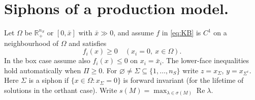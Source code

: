 \section{Siphons of a production model.}\label{s:KB}
\label{p:KBsiph}
\label{p:KBresponsezeros}\label{p:KBorder}

Let $\Omega$ be $\mathbb R_+^{n_S}$ or $[0,\bar x]$ with $\bar x\gg0$, and assume
$f$ in \eqref{eq:KB} is $C^1$ on a neighbourhood of $\Omega$ and satisfies
\[
 f_i(x)\ge0\quad(x_i=0,\ x\in\Omega).
\]
In the box case assume also $f_i(x)\le0$ on $x_i=\bar x_i$.
The lower-face inequalities hold automatically when $\Pi\ge0$.
For $\varnothing\ne \Sigma\subseteq\{1,\ldots,n_S\}$ write $z=x_\Sigma$, $y=x_{\Sigma^c}$.
Here $\Sigma$ is a siphon if $\{x\in\Omega:x_\Sigma=0\}$ is forward invariant
(for the lifetime of solutions in the orthant case).
Write $s(M)=\max_{\lambda\in\sigma(M)}\operatorname{Re}\lambda$.
